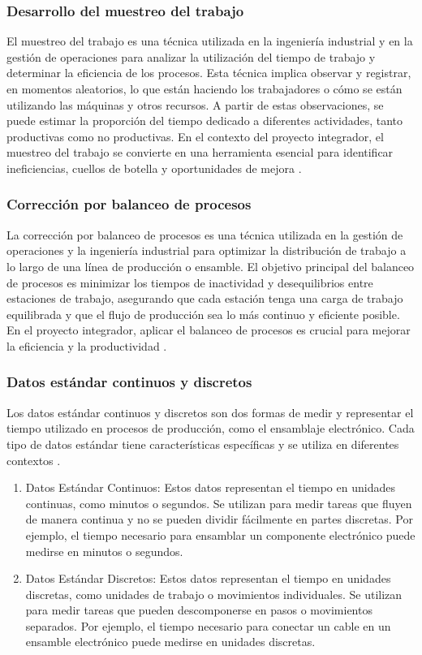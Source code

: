     \subsubsection{Desarrollo del muestreo del trabajo}
    El muestreo del trabajo es una técnica utilizada en la ingeniería industrial y en la gestión de operaciones para analizar la utilización del tiempo de trabajo y determinar la eficiencia de los procesos. Esta técnica implica observar y registrar, en momentos aleatorios, lo que están haciendo los trabajadores o cómo se están utilizando las máquinas y otros recursos. A partir de estas observaciones, se puede estimar la proporción del tiempo dedicado a diferentes actividades, tanto productivas como no productivas. En el contexto del proyecto integrador, el muestreo del trabajo se convierte en una herramienta esencial para identificar ineficiencias, cuellos de botella y oportunidades de mejora \cite{muestreo-trabajo}.
    \subsubsection{Corrección por balanceo de procesos}
    La corrección por balanceo de procesos es una técnica utilizada en la gestión de operaciones y la ingeniería industrial para optimizar la distribución de trabajo a lo largo de una línea de producción o ensamble. El objetivo principal del balanceo de procesos es minimizar los tiempos de inactividad y desequilibrios entre estaciones de trabajo, asegurando que cada estación tenga una carga de trabajo equilibrada y que el flujo de producción sea lo más continuo y eficiente posible. En el proyecto integrador, aplicar el balanceo de procesos es crucial para mejorar la eficiencia y la productividad \cite{balanceo-procesos}.
    \subsubsection{Datos estándar continuos y discretos}
    Los datos estándar continuos y discretos son dos formas de medir y representar el tiempo utilizado en procesos de producción, como el ensamblaje electrónico. Cada tipo de datos estándar tiene características específicas y se utiliza en diferentes contextos \cite{datos-estandar}.
    
    \begin{enumerate}
        \item Datos Estándar Continuos: Estos datos representan el tiempo en unidades continuas, como minutos o segundos. Se utilizan para medir tareas que fluyen de manera continua y no se pueden dividir fácilmente en partes discretas. Por ejemplo, el tiempo necesario para ensamblar un componente electrónico puede medirse en minutos o segundos.
    
        \item Datos Estándar Discretos: Estos datos representan el tiempo en unidades discretas, como unidades de trabajo o movimientos individuales. Se utilizan para medir tareas que pueden descomponerse en pasos o movimientos separados. Por ejemplo, el tiempo necesario para conectar un cable en un ensamble electrónico puede medirse en unidades discretas.
     
    \end{enumerate}
